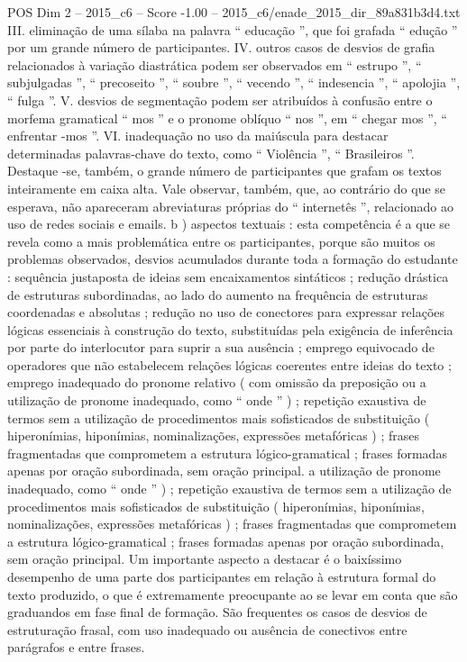 \begin{textsample}{POS Dim 2 – 2015\_c6 – Score -1.00 – 2015\_c6/enade\_2015\_dir\_89a831b3d4.txt}
III. eliminação de uma sílaba na palavra “ educação ”, que foi grafada “ edução ” por um grande número de participantes.
IV. outros casos de desvios de grafia relacionados à variação diastrática podem ser observados em “ estrupo ”, “ subjulgadas ”, “ precoseito ”, “ soubre ”, “ vecendo ”, “ indesencia ”, “ apolojia ”, “ fulga ”.
V. desvios de segmentação podem ser atribuídos à confusão entre o morfema gramatical “ mos ” e o pronome oblíquo “ nos ”, em “ chegar mos ”, “ enfrentar -mos ”.
VI. inadequação no uso da maiúscula para destacar determinadas palavras-chave do texto, como “ Violência ”, “ Brasileiros ”.
Destaque -se, também, o grande número de participantes que grafam os textos inteiramente em caixa alta.
Vale observar, também, que, ao contrário do que se esperava, não apareceram abreviaturas próprias do “ internetês ”, relacionado ao uso de redes sociais e emails. b ) aspectos textuais : esta competência é a que se revela como a mais problemática entre os participantes, porque são muitos os problemas observados, desvios acumulados durante toda a formação do estudante : sequência justaposta de ideias sem encaixamentos sintáticos ; redução drástica de estruturas subordinadas, ao lado do aumento na frequência de estruturas coordenadas e absolutas ; redução no uso de conectores para expressar relações lógicas essenciais à construção do texto, substituídas pela exigência de inferência por parte do interlocutor para suprir a sua ausência ; emprego equivocado de operadores que não estabelecem relações lógicas coerentes entre ideias do texto ; emprego inadequado do pronome relativo ( com omissão da preposição ou a utilização de pronome inadequado, como “ onde ” ) ; repetição exaustiva de termos sem a utilização de procedimentos mais sofisticados de substituição ( hiperonímias, hiponímias, nominalizações, expressões metafóricas ) ; frases fragmentadas que comprometem a estrutura lógico-gramatical ; frases formadas apenas por oração subordinada, sem oração principal. a utilização de pronome inadequado, como “ onde ” ) ; repetição exaustiva de termos sem a utilização de procedimentos mais sofisticados de substituição ( hiperonímias, hiponímias, nominalizações, expressões metafóricas ) ; frases fragmentadas que comprometem a estrutura lógico-gramatical ; frases formadas apenas por oração subordinada, sem oração principal.
Um importante aspecto a destacar é o baixíssimo desempenho de uma parte dos participantes em relação à estrutura formal do texto produzido, o que é extremamente preocupante ao se levar em conta que são graduandos em fase final de formação.
São frequentes os casos de desvios de estruturação frasal, com uso inadequado ou ausência de conectivos entre parágrafos e entre frases.

\end{textsample}
